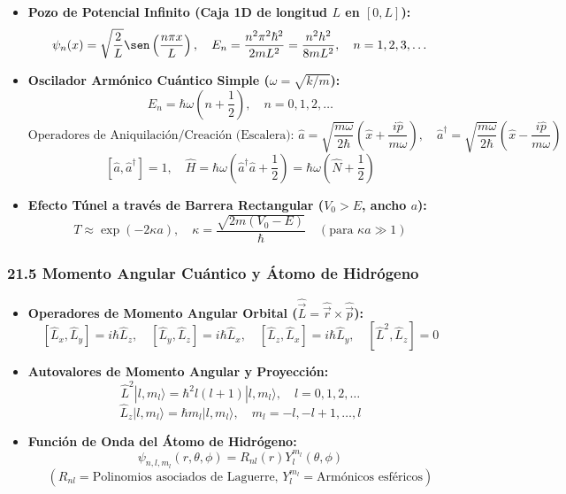 \documentclass[11pt,a4paper]{article}
\begin{document}
\begin{itemize}
  \item \textbf{Pozo de Potencial Infinito (Caja 1D de longitud $L$ en $[0, L]$):}
  \[
    \psi_n(x) = \sqrt{\frac{2}{L}}\sen\left( \frac{n\pi x}{L} \right), \quad E_n = \frac{n^2 \pi^2 \hbar^2}{2m L^2} = \frac{n^2 h^2}{8m L^2}, \quad n = 1, 2, 3, \dots
  \]
  \item \textbf{Oscilador Armónico Cuántico Simple ($\omega = \sqrt{k/m}$):}
  \[
    E_n = \hbar\omega \left( n + \frac{1}{2} \right), \quad n = 0, 1, 2, \dots
  \]
  \[
    \text{Operadores de Aniquilación/Creación (Escalera): } \hat{a} = \sqrt{\frac{m\omega}{2\hbar}}\left(\hat{x} + \frac{i\hat{p}}{m\omega}\right), \quad \hat{a}^\dagger = \sqrt{\frac{m\omega}{2\hbar}}\left(\hat{x} - \frac{i\hat{p}}{m\omega}\right)
  \]
  \[
    [\hat{a}, \hat{a}^\dagger] = 1, \quad \hat{H} = \hbar\omega\left(\hat{a}^\dagger \hat{a} + \frac{1}{2}\right) = \hbar\omega\left(\hat{N} + \frac{1}{2}\right)
  \]
  \item \textbf{Efecto Túnel a través de Barrera Rectangular ($V_0 > E$, ancho $a$):}
  \[
    T \approx \exp(-2\kappa a), \quad \kappa = \frac{\sqrt{2m(V_0 - E)}}{\hbar} \quad (\text{para } \kappa a \gg 1)
  \]
\end{itemize}

\subsubsection*{21.5 Momento Angular Cuántico y Átomo de Hidrógeno}

\begin{itemize}
  \item \textbf{Operadores de Momento Angular Orbital ($\hat{\vec{L}} = \hat{\vec{r}} \times \hat{\vec{p}}$):}
  \[
    [\hat{L}_x, \hat{L}_y] = i\hbar \hat{L}_z, \quad [\hat{L}_y, \hat{L}_z] = i\hbar \hat{L}_x, \quad [\hat{L}_z, \hat{L}_x] = i\hbar \hat{L}_y, \quad [\hat{L}^2, \hat{L}_z] = 0
  \]
  \item \textbf{Autovalores de Momento Angular y Proyección:}
  \[
    \hat{L}^2 |l, m_l\rangle = \hbar^2 l(l + 1)|l, m_l\rangle, \quad l = 0, 1, 2, \dots
  \]
  \[
    \hat{L}_z |l, m_l\rangle = \hbar m_l |l, m_l\rangle, \quad m_l = -l, -l+1, \dots, l
  \]
  \item \textbf{Función de Onda del Átomo de Hidrógeno:}
  \[
    \psi_{n, l, m_l}(r, \theta, \phi) = R_{nl}(r) Y_l^{m_l}(\theta, \phi)
  \]
  \[
    (R_{nl} = \text{Polinomios asociados de Laguerre}, \, Y_l^{m_l} = \text{Armónicos esféricos})
  \]
\end{itemize}
\end{document}
